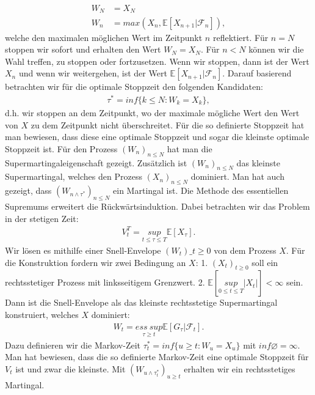 \documentclass[12pt,titlepage,headsepline]{article}
\begin{document}
    \begin{align*}
      W_N &= X_N \\
      W_n &= max(X_n,\mathbb{E}[X_{n+1} \lvert \mathcal{F}_n]),
    \end{align*}
    welche den maximalen möglichen Wert im Zeitpunkt $n$ reflektiert. Für $n=N$ stoppen wir sofort und erhalten den Wert $W_N = X_N$. Für $n<N$ können wir die Wahl treffen, zu stoppen oder fortzusetzen. Wenn wir stoppen, dann ist der Wert $X_n$ und wenn wir weitergehen, ist der Wert $\mathbb{E}[X_{n+1} \lvert \mathcal{F}_n]$. Darauf basierend betrachten wir für die optimale Stoppzeit den folgenden Kandidaten:
    \begin{align*}
      \tau^* = inf\{k \leq N : W_k = X_k \},
    \end{align*}
    d.h. wir stoppen an dem Zeitpunkt, wo der maximale mögliche Wert den Wert von $X$ zu dem Zeitpunkt nicht überschreitet. Für die so definierte Stoppzeit hat man bewiesen, dass diese eine optimale Stoppzeit und sogar die kleinste optimale Stoppzeit ist. Für den Prozess $(W_n)_{n\leq N}$ hat man die Supermartingaleigenschaft gezeigt. Zusätzlich ist $(W_n)_{n\leq N}$ das kleinste Supermartingal, welches den Prozess $(X_n)_{n\leq N}$ dominiert. Man hat auch gezeigt, dass $(W_{n \wedge \tau^*})_{n\leq N}$ ein Martingal ist.
    \hfill\break
    Die Methode des essentiellen Supremums erweitert die Rückwärtsinduktion. Dabei betrachten wir das Problem in der stetigen Zeit:
    \begin{align*}
      V_t^T = \underset{t\leq \tau \leq T}{sup} \mathbb{E}[X_{\tau}].
    \end{align*}
    Wir lösen es mithilfe einer Snell-Envelope $(W_t)\_{t\geq 0}$ von dem Prozess $X$. Für die Konstruktion fordern wir zwei Bedingung an $X$: 1. $(X_t)_{t \geq 0}$ soll ein rechtsstetiger Prozess mit linksseitigem Grenzwert. 2. $\mathbb{E}[\underset{0\leq t \leq T}{sup} \lvert X_t \rvert] < \infty$ sein. Dann ist die Snell-Envelope als das kleinste rechtsstetige Supermartingal konstruiert, welches $X$ dominiert:
    \begin{align*}
      W_t = \underset{\tau \geq t}{ess \ sup} \mathbb{E}[G_{\tau} \lvert \mathcal{F}_t].
    \end{align*}
    Dazu definieren wir die Markov-Zeit $\tau^*_t = inf\{u \geq t : W_u = X_u \}$ mit $inf \varnothing = \infty$. Man hat bewiesen, dass die so definierte Markov-Zeit eine optimale Stoppzeit für $V_t$ ist und zwar die kleinste. Mit $(W_{u\wedge \tau^*_t})_{u\geq t}$ erhalten wir ein rechtsstetiges Martingal.
\end{document}
